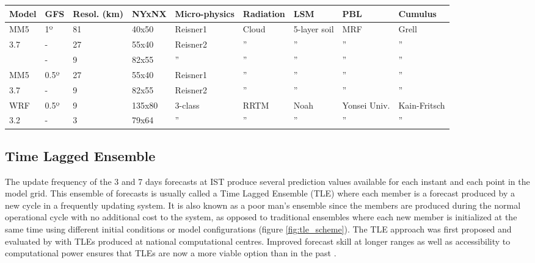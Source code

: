 \begin{table}[!htp]
\small
\centering
{}
\label{tb:nwp_options}
\begin{tabularx}{\textwidth}{Y|YYYYYYYY}
    \toprule
    Model & GFS & Resol. (km) & NYxNX & Micro-physics & Radiation & LSM & PBL & Cumulus \\
    \midrule
    MM5     & 1º & 81 & 40x50  & Reisner1 & Cloud & 5-layer soil & MRF & Grell \\
    3.7     & -  & 27 & 55x40  & Reisner2 &  '' & '' & '' & '' \\
            & -  & 9  & 82x55  & '' &  '' & '' & '' & '' \\
    \midrule 
    MM5     & 0.5º & 27 & 55x40 & Reisner1 &  '' & '' & '' & '' \\
    3.7     & -    & 9  & 82x55 & Reisner2 &  '' & '' & '' & '' \\        
    \midrule
    WRF     & 0.5º & 9 & 135x80 & 3-class & RRTM & Noah & Yonsei Univ. & Kain-Fritsch \\
    3.2     & -    & 3 & 79x64  & ''& '' & '' & '' & '' \\    
            
    \bottomrule
\end{tabularx}
\end{table}
\FloatBarrier

\subsection{Time Lagged Ensemble}
\label{sec:tle}

The update frequency of the 3 and 7 days forecasts at IST produce several prediction values available for each instant and each point in the model grid.  This ensemble of forecasts is usually called a Time Lagged Ensemble (TLE) where each member is a forecast produced by a new cycle in a frequently updating system. It is also known as a poor man's ensemble since the members are produced during the normal operational cycle with no additional cost to the system, as opposed to traditional ensembles where each new member is initialized at the same time using different initial conditions or model configurations (figure \ref{fig:tle_scheme}). The TLE approach was first proposed and evaluated by \cite{HoffmanKalnay1983} with TLEs produced at national computational centres. Improved forecast skill at longer ranges as well as accessibility to computational power ensures that TLEs are now a more viable option than in the past \citep{Mittermaier2007}.

